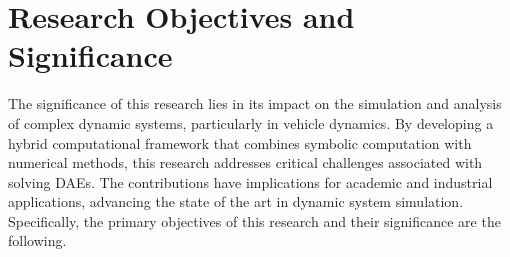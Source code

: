 
\section{Research Objectives and Significance}

The significance of this research lies in its impact on the simulation and analysis of complex dynamic systems, particularly in vehicle dynamics. By developing a hybrid computational framework that combines symbolic computation with numerical methods, this research addresses critical challenges associated with solving \acp{DAE}. The contributions have implications for academic and industrial applications, advancing the state of the art in dynamic system simulation. Specifically, the primary objectives of this research and their significance are the following.

